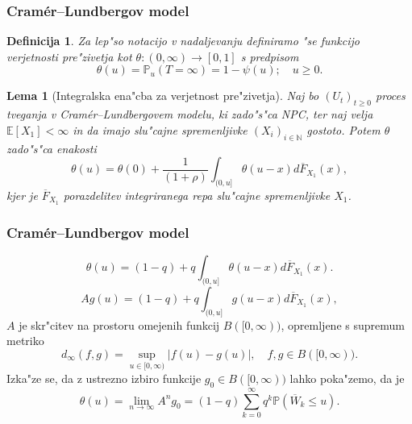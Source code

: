 \documentclass[handout]{beamer} %
\theoremstyle{plain}
\newtheorem{definicija}{Definicija}
\newtheorem{lema}{Lema}
\newcommand{\N}{\mathbb{N}}
\newcommand{\E}{\mathbb{E}}
\newcommand{\Prob}{\mathbb{P}}
\begin{document}
\begin{frame}
  \frametitle{Cramér--Lundbergov model}
  \begin{definicija}
    Za lep"so notacijo v nadaljevanju definiramo "se funkcijo \textit{verjetnosti pre"zivetja} kot
    $\theta:(0, \infty) \to [0, 1]$ s predpisom
    \begin{equation*}
        \theta(u) = \Prob_u\left(T=\infty\right) = 1 - \psi(u); \quad u\geq 0.
    \end{equation*}
    \label{def:verjetnostPrezivetja}
  \end{definicija}
  \pause
  \begin{lema}[Integralska ena"cba za verjetnost pre"zivetja]
    Naj bo $(U_t)_{t\geq0}$ proces tveganja v Cramér--Lundbergovem modelu, ki zado"s"ca NPC, ter naj 
    velja $\E\left[X_1\right]<\infty$ in da imajo slu"cajne spremenljivke $(X_i)_{i\in\N}$ 
    gostoto. Potem $\theta$ zado"s"ca  enakosti
    \begin{equation*}
        \theta(u) = \theta(0) + \frac{1}{(1+\rho)} \int_{(0, u]}\theta(u - x)d\overline{F}_{X_1}(x),
    \end{equation*}
    kjer je $\overline{F}_{X_1}$ porazdelitev integriranega repa  
    slu"cajne spremenljivke $X_1$.
    \label{lema:verjetnostPrezivetja}
  \end{lema}
\end{frame}

\begin{frame}
  \frametitle{Cramér--Lundbergov model}
  \begin{equation*}
    \theta(u) = (1 - q) + q\int_{(0, u]}\theta(u - x)d\overline{F}_{X_1}(x).
  \end{equation*}
  \pause
  \begin{equation*}
    Ag(u) = (1 - q) + q\int_{(0, u]}g(u - x)d\overline{F}_{X_1}(x),
    \label{eq:operator}
  \end{equation*}
  \pause
  $A$ je skr"citev na prostoru omejenih funkcij $B([0, \infty))$, opremljene s supremum metriko
  \begin{equation*}
    d_\infty(f, g) = \sup_{u\in[0, \infty)}\big|f(u) - g(u)\big|,  \quad f, g\in B([0, \infty)).
  \end{equation*}
  \pause
  Izka"ze se, da z ustrezno izbiro funkcije $g_0\in B([0, \infty))$ lahko poka"zemo, da je 
  \begin{equation*}
    \theta(u) = \lim_{n\to\infty} A^ng_0 = (1 - q)\sum_{k = 0}^\infty q^k\Prob\left(\overline{W}_k \leq u\right).
  \end{equation*}
\end{frame}
\end{document}
